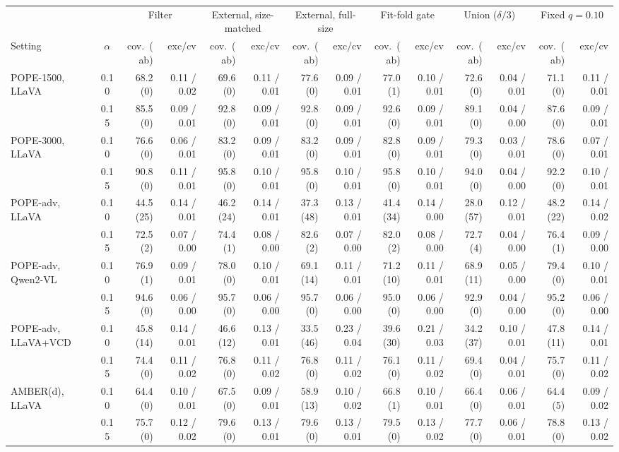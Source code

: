 \begin{tabular}{lcrrrrrrrrrrrr}
\toprule
 & & \multicolumn{2}{c}{Filter} & \multicolumn{2}{c}{External, size-matched} & \multicolumn{2}{c}{External, full-size} & \multicolumn{2}{c}{Fit-fold gate} & \multicolumn{2}{c}{Union ($\delta/3$)} & \multicolumn{2}{c}{Fixed $q{=}0.10$}\\
\cmidrule(lr){3-4}\cmidrule(lr){5-6}\cmidrule(lr){7-8}\cmidrule(lr){9-10}\cmidrule(lr){11-12}\cmidrule(lr){13-14}
Setting & $\alpha$ & cov.\ (ab) & exc/cv & cov.\ (ab) & exc/cv & cov.\ (ab) & exc/cv & cov.\ (ab) & exc/cv & cov.\ (ab) & exc/cv & cov.\ (ab) & exc/cv\\
\midrule
POPE-1500, LLaVA & 0.10 & 68.2 (0) & 0.11 / 0.02 & 69.6 (0) & 0.11 / 0.01 & 77.6 (0) & 0.09 / 0.01 & 77.0 (1) & 0.10 / 0.01 & 72.6 (0) & 0.04 / 0.01 & 71.1 (0) & 0.11 / 0.01\\
 & 0.15 & 85.5 (0) & 0.09 / 0.01 & 92.8 (0) & 0.09 / 0.01 & 92.8 (0) & 0.09 / 0.01 & 92.6 (0) & 0.09 / 0.01 & 89.1 (0) & 0.04 / 0.00 & 87.6 (0) & 0.09 / 0.01\\
\addlinespace
POPE-3000, LLaVA & 0.10 & 76.6 (0) & 0.06 / 0.01 & 83.2 (0) & 0.09 / 0.01 & 83.2 (0) & 0.09 / 0.01 & 82.8 (0) & 0.09 / 0.01 & 79.3 (0) & 0.03 / 0.01 & 78.6 (0) & 0.07 / 0.01\\
 & 0.15 & 90.8 (0) & 0.11 / 0.01 & 95.8 (0) & 0.10 / 0.01 & 95.8 (0) & 0.10 / 0.01 & 95.8 (0) & 0.10 / 0.01 & 94.0 (0) & 0.04 / 0.00 & 92.2 (0) & 0.10 / 0.01\\
\addlinespace
POPE-adv, LLaVA & 0.10 & 44.5 (25) & 0.14 / 0.01 & 46.2 (24) & 0.14 / 0.01 & 37.3 (48) & 0.13 / 0.01 & 41.4 (34) & 0.14 / 0.00 & 28.0 (57) & 0.12 / 0.01 & 48.2 (22) & 0.14 / 0.02\\
 & 0.15 & 72.5 (2) & 0.07 / 0.00 & 74.4 (1) & 0.08 / 0.00 & 82.6 (2) & 0.07 / 0.00 & 82.0 (2) & 0.08 / 0.00 & 72.7 (4) & 0.04 / 0.00 & 76.4 (1) & 0.09 / 0.00\\
\addlinespace
POPE-adv, Qwen2-VL & 0.10 & 76.9 (1) & 0.09 / 0.01 & 78.0 (0) & 0.10 / 0.01 & 69.1 (14) & 0.11 / 0.01 & 71.2 (10) & 0.11 / 0.01 & 68.9 (11) & 0.05 / 0.00 & 79.4 (0) & 0.10 / 0.01\\
 & 0.15 & 94.6 (0) & 0.06 / 0.00 & 95.7 (0) & 0.06 / 0.00 & 95.7 (0) & 0.06 / 0.00 & 95.0 (0) & 0.06 / 0.00 & 92.9 (0) & 0.04 / 0.00 & 95.2 (0) & 0.06 / 0.00\\
\addlinespace
POPE-adv, LLaVA+VCD & 0.10 & 45.8 (14) & 0.14 / 0.01 & 46.6 (12) & 0.13 / 0.01 & 33.5 (46) & 0.23 / 0.04 & 39.6 (30) & 0.21 / 0.03 & 34.2 (37) & 0.10 / 0.01 & 47.8 (11) & 0.14 / 0.01\\
 & 0.15 & 74.4 (0) & 0.11 / 0.02 & 76.8 (0) & 0.11 / 0.02 & 76.8 (0) & 0.11 / 0.02 & 76.1 (0) & 0.11 / 0.02 & 69.4 (0) & 0.04 / 0.01 & 75.7 (0) & 0.11 / 0.02\\
\addlinespace
AMBER(d), LLaVA & 0.10 & 64.4 (0) & 0.10 / 0.01 & 67.5 (0) & 0.09 / 0.01 & 58.9 (13) & 0.10 / 0.02 & 66.8 (1) & 0.10 / 0.01 & 66.4 (0) & 0.06 / 0.01 & 64.4 (5) & 0.09 / 0.02\\
 & 0.15 & 75.7 (0) & 0.12 / 0.02 & 79.6 (0) & 0.13 / 0.01 & 79.6 (0) & 0.13 / 0.01 & 79.5 (0) & 0.13 / 0.02 & 77.7 (0) & 0.06 / 0.01 & 78.8 (0) & 0.13 / 0.02\\
\bottomrule
\end{tabular}
